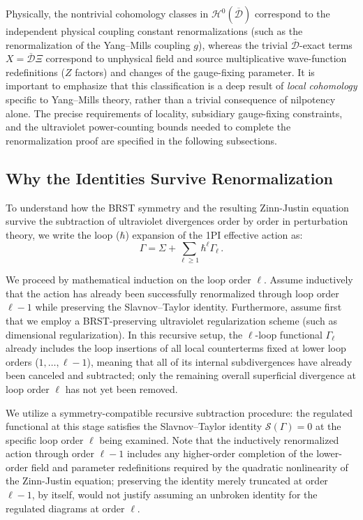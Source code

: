 Physically, the nontrivial cohomology classes in \(\mathcal{H}^0(\overline{\mathcal{D}})\) correspond to the independent physical coupling constant renormalizations (such as the renormalization of the Yang--Mills coupling \(g\)), whereas the trivial \(\overline{\mathcal{D}}\)-exact terms \(X = \overline{\mathcal{D}}\Xi\) correspond to unphysical field and source multiplicative wave-function redefinitions (\(Z\) factors) and changes of the gauge-fixing parameter. It is important to emphasize that this classification is a deep result of \textit{local cohomology} specific to Yang--Mills theory, rather than a trivial consequence of nilpotency alone. The precise requirements of locality, subsidiary gauge-fixing constraints, and the ultraviolet power-counting bounds needed to complete the renormalization proof are specified in the following subsections.

\subsection{Why the Identities Survive Renormalization}

To understand how the BRST symmetry and the resulting Zinn-Justin equation survive the subtraction of ultraviolet divergences order by order in perturbation theory, we write the loop (\(\hbar\)) expansion of the 1PI effective action as:
\begin{equation} \label{eq:gamma_loop_expansion}
    \Gamma = \Sigma + \sum_{\ell \ge 1} \hbar^\ell \Gamma_\ell \, .
\end{equation}

We proceed by mathematical induction on the loop order \(\ell\). Assume inductively that the action has already been successfully renormalized through loop order \(\ell - 1\) while preserving the Slavnov--Taylor identity. Furthermore, assume first that we employ a BRST-preserving ultraviolet regularization scheme (such as dimensional regularization). In this recursive setup, the \(\ell\)-loop functional \(\Gamma_\ell\) already includes the loop insertions of all local counterterms fixed at lower loop orders (\(1, \dots, \ell - 1\)), meaning that all of its internal subdivergences have already been canceled and subtracted; only the remaining overall superficial divergence at loop order \(\ell\) has not yet been removed.

We utilize a symmetry-compatible recursive subtraction procedure: the regulated functional at this stage satisfies the Slavnov--Taylor identity \(\mathcal{S}(\Gamma) = 0\) at the specific loop order \(\ell\) being examined. Note that the inductively renormalized action through order \(\ell - 1\) includes any higher-order completion of the lower-order field and parameter redefinitions required by the quadratic nonlinearity of the Zinn-Justin equation; preserving the identity merely truncated at order \(\ell - 1\), by itself, would not justify assuming an unbroken identity for the regulated diagrams at order \(\ell\).


